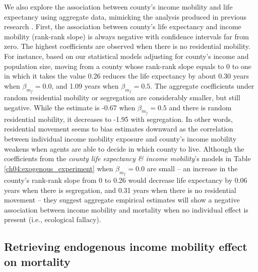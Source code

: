 \documentclass[class=article, crop=false, 12pt]{standalone}
\begin{document}
We also explore the association between county's income mobility and life expectancy using aggregate data, mimicking the analysis produced in previous research \citep{venkataramani2015, daza2018a, venkataramani2020}. First,  the association between county's life expectancy and income mobility (rank-rank slope) is always negative with confidence intervals far from zero. The highest coefficients are observed when there is no residential mobility. For instance, based on our statistical models adjusting for county's income and population size, moving from a county whose rank-rank slope equals to 0 to one in which it takes the value 0.26 reduces the life expectancy by about 0.30 years when $\beta_{m_{f}} = 0.0$, and 1.09 years when $\beta_{m_{f}} = 0.5$. The aggregate coefficients under random residential mobility or segregation are considerably smaller, but still negative. While the estimate is -0.67 when $\beta_{m_{f}} = 0.5$ and there is random residential mobility, it decreases to -1.95 with segregation. In other words, residential movement seems to bias estimates downward as the correlation between individual income mobility exposure and county's income mobility weakens when agents are able to decide in which county to live. Although the coefficients from the \textit{county life expectancy \& income mobility}'s models in Table \ref{ch04:exogenous_experiment} when $\beta_{m_{f}} = 0.0$ are small -- an increase in the county's rank-rank slope from 0 to 0.26 would decrease life expectancy by 0.06 years when there is segregation, and 0.31 years when there is no residential movement -- they suggest aggregate empirical estimates will show a negative association between income mobility and mortality when no individual effect is present (i.e., ecological fallacy). 

\subsection{Retrieving endogenous income mobility effect on mortality}
\end{document}

